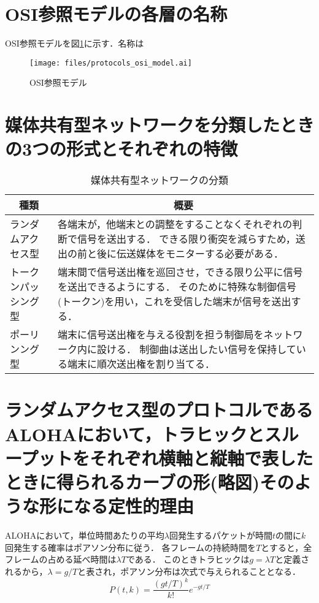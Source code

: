 \documentclass[10.5pt]{jsarticle}
\begin{document}
\section{OSI参照モデルの各層の名称}
OSI参照モデルを図\ref{osi_refmodel}に示す．名称は
\begin{figure}[h]
	\centering
	\texttt{[image: files/protocols\_osi\_model.ai]}
	\caption{OSI参照モデル}\label{osi_refmodel}
\end{figure}



\section{媒体共有型ネットワークを分類したときの3つの形式とそれぞれの特徴}
\begin{table}[H]
	\centering
	\caption{媒体共有型ネットワークの分類} \label{media-sharing-network}
	\begin{tabularx}{0.9\hsize}{|l|X|} 
		\hline
		\multicolumn{1}{|c|}{\textbf{種類}}&\multicolumn{1}{c|}{\textbf{概要}}\\\hline\hline
		ランダムアクセス型&各端末が，他端末との調整をすることなくそれぞれの判断で信号を送出する．
							できる限り衝突を減らすため，送出の前と後に伝送媒体をモニターする必要がある．\\\hline
		トークンパッシング型&端末間で信号送出権を巡回させ，できる限り公平に信号を送出できるようにする．
							そのために特殊な制御信号(トークン)を用い，これを受信した端末が信号を送出する．\\\hline
		ポーリンング型&端末に信号送出権を与える役割を担う制御局をネットワーク内に設ける．
							制御曲は送出したい信号を保持している端末に順次送出権を割り当てる．\\\hline
	\end{tabularx}
\end{table}


\section{ランダムアクセス型のプロトコルであるALOHAにおいて，トラヒックとスループットをそれぞれ横軸と縦軸で表したときに得られるカーブの形(略図)そのような形になる定性的理由}
ALOHAにおいて，単位時間あたりの平均$\lambda$回発生するパケットが時間$t$の間に$k$回発生する確率はポアソン分布に従う．
各フレームの持続時間を$T$とすると，全フレームの占める延べ時間は$\lambda T$である．
このときトラヒックは$g=\lambda T$と定義されるから，$\lambda = g/T$と表され，ポアソン分布は次式で与えられることとなる．
\[P(t, k) = \frac{(gt/T)^k}{k!}e^{-gt/T}\]
\end{document}
